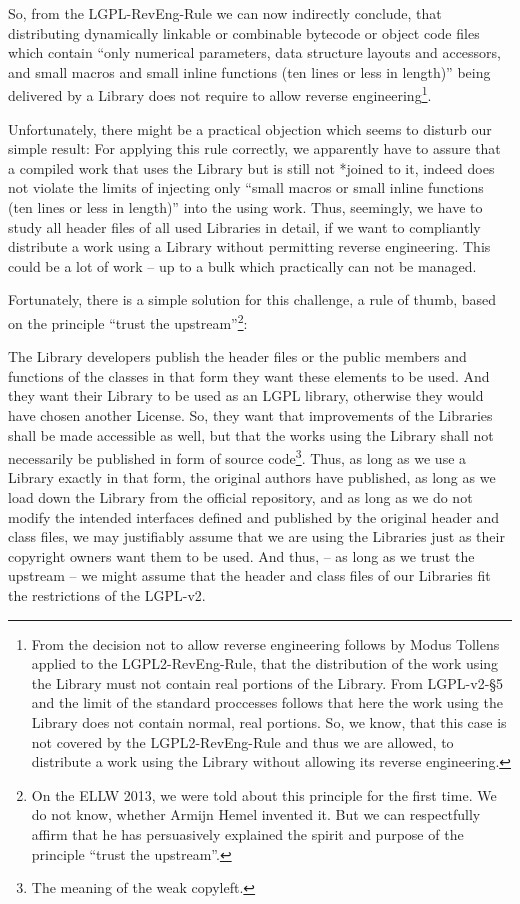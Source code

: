 So, from the LGPL-RevEng-Rule we can now indirectly conclude, that distributing
dynamically linkable or combinable bytecode or object code files which contain
\enquote{only numerical parameters, data structure layouts and accessors, and
small macros and small inline functions (ten lines or less in length)} being
delivered by a Library does not require to allow reverse
engineering\footnote{From the decision not to allow reverse engineering follows
by Modus Tollens applied to the LGPL2-RevEng-Rule, that the distribution of the
work using the Library must not contain real portions of the Library. From
LGPL-v2-§5 and the limit of the standard proccesses follows that here the work
using the Library does not contain normal, real portions. So, we know, that this
case is not covered by the LGPL2-RevEng-Rule and thus we are allowed, to
distribute a work using the Library without allowing its reverse engineering.}.

Unfortunately, there might be a practical objection which seems to disturb our
simple result: For applying this rule correctly, we apparently have to assure
that a compiled work that uses the Library but is still not *joined to it,
indeed does not violate the limits of injecting only \enquote{small macros or
small inline functions (ten lines or less in length)} into the using work. Thus,
seemingly, we have to study all header files of all used Libraries in detail, if
we want to compliantly distribute a work using a Library without permitting
reverse engineering. This could be a lot of work -- up to a bulk which
practically can not be managed.

Fortunately, there is a simple solution for this challenge, a rule of thumb,
based on the principle \enquote{trust the upstream}\footnote{On the ELLW 2013,
we were told about this principle for the first time. We do not know, whether
Armijn Hemel invented it. But we can respectfully affirm that he has
persuasively explained the spirit and purpose of the principle \enquote{trust
the upstream}.}:

The Library developers publish the header files or the public members and
functions of the classes in that form they want these elements to be used.
And they want their Library to be used as an LGPL library, otherwise they would
have chosen another License. So, they want that improvements of the Libraries
shall be made accessible as well, but that the works using the Library shall not
necessarily be published in form of source code\footnote{The meaning of the weak
copyleft.}. Thus, as long as we use a Library exactly in that form, the original
authors have published, as long as we load down the Library from the official
repository, and as long as we do not modify the intended interfaces defined and
published by the original header and class files, we may justifiably assume that
we are using the Libraries just as their copyright owners want them to be used.
And thus, -- as long as we trust the upstream -- we might assume that the header
and class files of our Libraries fit the restrictions of the LGPL-v2.

